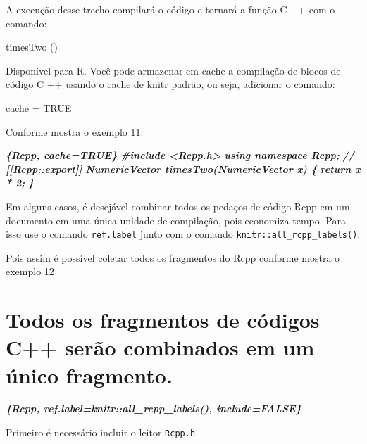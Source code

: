 \documentclass[
]{book}
\newenvironment{Shaded}{\begin{snugshade}}{\end{snugshade}}
\newcommand{\InformationTok}[1]{\textcolor[rgb]{0.56,0.35,0.01}{\textbf{\textit{#1}}}}
\begin{document}
A execução desse trecho compilará o código e tornará a função C ++ com o comando:

timesTwo ()

Disponível para R. Você pode armazenar em cache a compilação de blocos de código C ++ usando o cache de knitr padrão, ou seja, adicionar o comando:

cache = TRUE

Conforme mostra o exemplo 11.

\begin{Shaded}
\begin{Highlighting}[]
 \InformationTok{\textasciigrave{}\textasciigrave{}\textasciigrave{}\{Rcpp, cache=TRUE\}}
\InformationTok{\#include \textless{}Rcpp.h\textgreater{}}
\InformationTok{using namespace Rcpp;}
\InformationTok{// [[Rcpp::export]]}
\InformationTok{NumericVector timesTwo(NumericVector x) \{}
\InformationTok{return x * 2;}
\InformationTok{\}}
\InformationTok{\textasciigrave{}\textasciigrave{}\textasciigrave{}}
\end{Highlighting}
\end{Shaded}

Em alguns casos, é desejável combinar todos os pedaços de código Rcpp em um documento em uma única unidade de compilação, pois economiza tempo. Para isso use o comando \texttt{ref.label} junto com o comando \texttt{knitr::all\_rcpp\_labels()}.

Pois assim é possível coletar todos os fragmentos do Rcpp conforme mostra o exemplo 12

\hypertarget{todos-os-fragmentos-de-cuxf3digos-c-seruxe3o-combinados-em-um-uxfanico-fragmento.}{%
\section{Todos os fragmentos de códigos C++ serão combinados em um único fragmento.}\label{todos-os-fragmentos-de-cuxf3digos-c-seruxe3o-combinados-em-um-uxfanico-fragmento.}}

\begin{Shaded}
\begin{Highlighting}[]
 \InformationTok{\textasciigrave{}\textasciigrave{}\textasciigrave{}\{Rcpp, ref.label=knitr::all\_rcpp\_labels(), include=FALSE\}}
\InformationTok{\textasciigrave{}\textasciigrave{}\textasciigrave{}}
\end{Highlighting}
\end{Shaded}

Primeiro é necessário incluir o leitor \texttt{Rcpp.h}
\end{document}
